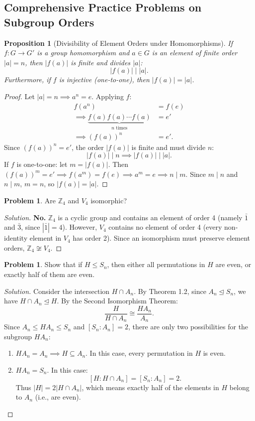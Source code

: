 \documentclass[12pt]{article}
\theoremstyle{definition}
\newtheorem{problem}[definition]{Problem}
\theoremstyle{plain}
\newtheorem{proposition}[theorem]{Proposition}
\begin{document}
\subsection{Comprehensive Practice Problems on Subgroup Orders}

\begin{proposition}[Divisibility of Element Orders under Homomorphisms]
If $f: G \to G'$ is a group homomorphism and $a \in G$ is an element of finite order $|a| = n$, then $|f(a)|$ is finite and divides $|a|$:
\[
|f(a)| \mid |a|.
\]
Furthermore, if $f$ is injective (one-to-one), then $|f(a)| = |a|$.
\end{proposition}

\begin{proof}
Let $|a| = n \implies a^n = e$.
Applying $f$:
\begin{align*}
f(a^n) &= f(e) \\
\implies \underbrace{f(a) f(a) \cdots f(a)}_{n \text{ times}} &= e' \\
\implies (f(a))^n &= e'.
\end{align*}
Since $(f(a))^n = e'$, the order $|f(a)|$ is finite and must divide $n$:
\[
|f(a)| \mid n \implies |f(a)| \mid |a|.
\]
If $f$ is one-to-one: let $m = |f(a)|$. Then $(f(a))^m = e' \implies f(a^m) = f(e) \implies a^m = e \implies n \mid m$. Since $m \mid n$ and $n \mid m$, $m = n$, so $|f(a)| = |a|$.
\end{proof}

\begin{problem}
Are $\mathbb{Z}_4$ and $V_4$ isomorphic?
\end{problem}
\begin{proof}[Solution]
\textbf{No.}
$\mathbb{Z}_4$ is a cyclic group and contains an element of order 4 (namely $\bar{1}$ and $\bar{3}$, since $|\bar{1}| = 4$).
However, $V_4$ contains no element of order 4 (every non-identity element in $V_4$ has order 2).
Since an isomorphism must preserve element orders, $\mathbb{Z}_4 \not\cong V_4$.
\end{proof}

\begin{problem}
Show that if $H \le S_n$, then either all permutations in $H$ are even, or exactly half of them are even.
\end{problem}
\begin{proof}[Solution]
Consider the intersection $H \cap A_n$.
By Theorem 1.2, since $A_n \trianglelefteq S_n$, we have $H \cap A_n \trianglelefteq H$.
By the Second Isomorphism Theorem:
\[
\frac{H}{H \cap A_n} \cong \frac{H A_n}{A_n}.
\]
Since $A_n \le H A_n \le S_n$ and $[S_n : A_n] = 2$, there are only two possibilities for the subgroup $H A_n$:
\begin{enumerate}
    \item $H A_n = A_n \implies H \subseteq A_n$. In this case, every permutation in $H$ is even.
    \item $H A_n = S_n$. In this case:
    \[
    [H : H \cap A_n] = [S_n : A_n] = 2.
    \]
    Thus $|H| = 2 |H \cap A_n|$, which means exactly half of the elements in $H$ belong to $A_n$ (i.e., are even).
\end{enumerate}
\end{proof}
\end{document}
